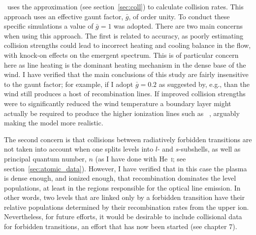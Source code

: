 \py\ uses the \cite{vanregemorter} approximation 
(see section~\ref{sec:coll}) to calculate collision rates.
This approach uses an effective gaunt factor, $\bar{g}$, of
order unity. To conduct these specific simulations a value of $\bar{g}=1$ 
was adopted. There are two main concerns when using this approach.
The first is related to accuracy, as poorly estimating collision strengths
could lead to incorrect heating and cooling balance in the flow, with
knock-on effects on the emergent spectrum. This is of particular concern
here as line heating is the dominant heating mechanism in the dense 
base of the wind. I have verified that the main conclusions of this study
are fairly insensitive to the gaunt factor; for example, if I adopt
$\bar{g}=0.2$ as suggested by, e.g., \cite{ferland2005} than the wind still
produces a host of recombination lines. 
If improved collision strengths were to significantly reduced the wind temperature
a boundary layer might
actually be required to produce the higher ionization lines such as 
\heiiopt\ \citep[see e.g.][]{hoare1991}, arguably making the model
more realistic.

The second concern is that 
collisions between radiatively forbidden transitions are not taken into 
account when one splits levels into $l$- and $s$-subshells, as well
as principal quantum number, $n$ (as I have done with He~\textsc{i}; 
see section~\ref{sec:atomic_data}). However, I have verified that
in this case the plasma is dense enough, and ionized enough, 
that recombination dominates the level populations, at least in 
the regions responsible for the optical line emission. In other words, two levels
that are linked only by a forbidden transition have their relative populations
determined by their recombination rates from the upper ion.
Nevertheless, for future efforts, it would be desirable to include
collisional data for forbidden transitions, an effort that has now
been started (see chapter 7).







